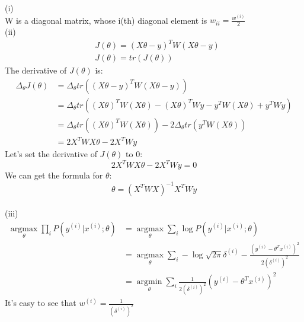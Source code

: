 \begin{answer}
(i)\\
W is a diagonal matrix, whose i(th) diagonal element is $w_{ii} = \frac{w^{(i)}}{2}$ \\
(ii)\\
\begin{align*}
    &J(\theta) = (X\theta - y)^T W (X\theta - y)\\
    &J(\theta) = tr(J(\theta))
\end{align*}
The derivative of $J(\theta)$ is:
\begin{align*}
    \Delta_\theta J(\theta) &= \Delta_\theta tr((X\theta - y)^T W (X\theta - y))\\
    &= \Delta_\theta tr( (X\theta)^T W (X\theta) - (X\theta)^T W y - y^T W (X\theta) + y^T W y)\\
    &= \Delta_\theta  tr( (X\theta)^T W (X\theta)) - 2\Delta_\theta tr(y^T W (X\theta))\\
    &= 2 X^T W X \theta - 2 X^T W y
\end{align*}
Let's set the derivative of $J(\theta)$ to $0$:
    $$2 X^T W X \theta - 2 X^T W y = 0$$
We can get the formula for $\theta$:
    $$\theta = (X^T W X)^{-1} X^T W y$$\\

(iii)
\begin{align*}
    \mathop{\arg\max}\limits_\theta \prod\limits_i P(y^{(i)}|x^{(i)};\theta) &= \mathop{\arg\max}\limits_\theta \sum\limits_i \log P(y^{(i)}|x^{(i)};\theta)\\
    &= \mathop{\arg\max}\limits_\theta \sum\limits_i -\log\sqrt{2\pi}\delta^{(i)} - \frac{(y^{(i)} - \theta^T x^{(i)}) ^ 2}{2(\delta^{(i)})^2}\\
    &= \mathop{\arg\min}\limits_\theta \sum\limits_i \frac{1}{2(\delta^{(i)})^2}(y^{(i)} - \theta^T x^{(i)})^2
\end{align*}
It's easy to see that $w^{(i)} = \frac{1}{(\delta^{(i)})^2}$
\end{answer}
